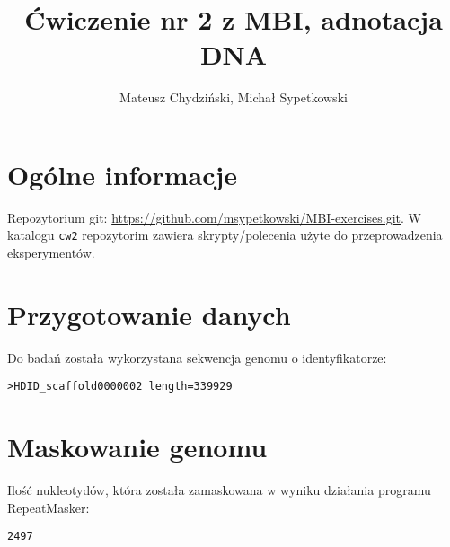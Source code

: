 \documentclass[a4paper]{article}
\begin{document}
\title{Ćwiczenie nr 2 z MBI, adnotacja DNA}
\author{Mateusz Chydziński, Michał Sypetkowski}
\maketitle

\section{Ogólne informacje}
Repozytorium git: \url{https://github.com/msypetkowski/MBI-exercises.git}.
W katalogu \texttt{cw2} repozytorim zawiera skrypty/polecenia użyte do przeprowadzenia eksperymentów.

\section{Przygotowanie danych}
Do badań została wykorzystana sekwencja genomu o identyfikatorze:
\begin{verbatim}
>HDID_scaffold0000002 length=339929
\end{verbatim}

\section{Maskowanie genomu}
Ilość nukleotydów, która została zamaskowana w wyniku działania programu RepeatMasker:
\begin{verbatim}
2497
\end{verbatim}
\end{document}

